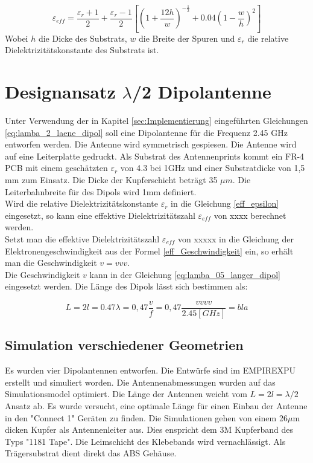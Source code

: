 \begin{equation}\label{eff_epsilon}
\varepsilon_{eff}=\dfrac{\varepsilon_r+1}{2}+\dfrac{\varepsilon_r-1}{2}\left[\left(1+\dfrac{12h}{w}\right)^{-\frac{1}{2}}+0.04\left(1-\dfrac{w}{h}\right)^{2}\right]
\end{equation}
Wobei $h$ die Dicke des Substrats, $w$ die Breite der Spuren und  $\varepsilon_{r}$ die relative Dielektrizitätskonstante des Substrats ist. 

\section{Designansatz $\lambda$/2 Dipolantenne}  
Unter Verwendung der in Kapitel \ref{sec:Implementierung} eingeführten Gleichungen \ref{eq:lamba_2_laene_dipol} soll eine Dipolantenne für die Frequenz 2.45 GHz entworfen werden. Die Antenne wird symmetrisch gespiesen. Die Antenne wird auf eine Leiterplatte gedruckt. Als Substrat des Antennenprints kommt ein  FR-4 PCB mit einem geschätzten  $\varepsilon_r $ von 4.3 bei 1GHz und einer Substratdicke von 1,5 mm  zum Einsatz. Die Dicke der Kupferschicht beträgt 35 $\mu m$. Die Leiterbahnbreite für des Dipols wird 1mm  definiert.\\

Wird die relative Dielektrizitätskonstante $\varepsilon_{r}$ in die Gleichung \ref{eff_epsilon} eingesetzt, so kann eine effektive Dielektrizitätszahl $\varepsilon_{eff}$  von xxxx berechnet werden.\\

Setzt man die effektive Dielektrizitätszahl $\varepsilon_{eff}$ von xxxxx  in die Gleichung der Elektronengeschwindigkeit aus der Formel \ref{eff_Geschwindigkeit} ein, so erhält man die Geschwindigkeit $v=vvv$. \\
Die Geschwindigkeit $v$  kann in der  Gleichung \ref{eq:lamba_05_langer_dipol} eingesetzt werden. Die Länge des Dipols lässt sich bestimmen als:

\begin{equation}\label{eq:lamba_05_langer_dipol}
L=2l = 0.47 \lambda= 0,47 \dfrac{v}{f}=0,47 \dfrac{vvvv}{2.45[GHz]}=bla
\end{equation} 
\subsection{Simulation  verschiedener Geometrien}
Es wurden vier Dipolantennen entworfen. Die Entwürfe sind im EMPIREXPU erstellt und simuliert worden. Die Antennenabmessungen wurden auf das Simulationsmodel optimiert. Die Länge der Antennen weicht vom $L=2l=\lambda/2$ Ansatz ab. Es wurde versucht, eine optimale Länge für einen Einbau der Antenne in den "Connect 1" Geräten zu finden. Die Simulationen gehen von einem 26$\mu$m dicken Kupfer als Antennenleiter aus. Dies enspricht dem 3M Kupferband des Typs "1181 Tape". Die Leimschicht des Klebebands wird vernachlässigt. Als Trägersubstrat dient direkt das ABS Gehäuse\cite{Kupferband}.
